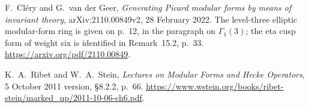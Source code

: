 F.~Cl\'ery and G.~van der Geer,
\emph{Generating Picard modular forms by means of invariant theory},
arXiv:2110.00849v2, 28 February 2022.
The level-three elliptic modular-form ring is given on p.~12, in the
paragraph on $\Gamma_1(3)$; the eta cusp form of weight six is identified
in Remark~15.2, p.~33.
\url{https://arxiv.org/pdf/2110.00849}.

K.~A.~Ribet and W.~A.~Stein,
\emph{Lectures on Modular Forms and Hecke Operators},
5 October 2011 version, \S8.2.2, p.~66.
\url{https://www.wstein.org/books/ribet-stein/marked_up/2011-10-06-ch6.pdf}.
